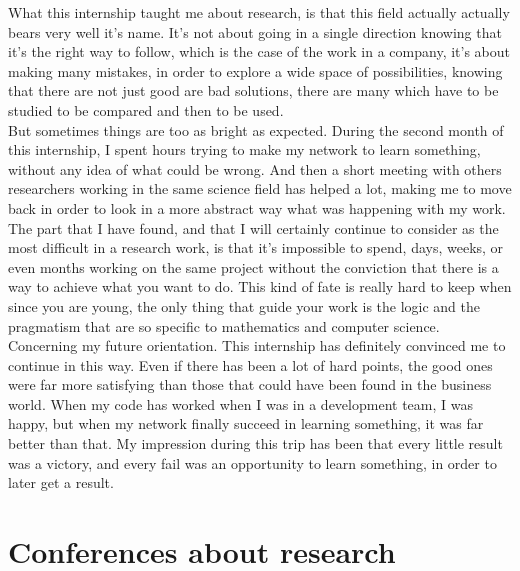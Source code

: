 \documentclass{report}
\begin{document}
		What this internship taught me about research, is that this field actually actually bears very well it's name. It's not about going in a single direction knowing that it's the right way to follow, which is the case of the work in a company, it's about making many mistakes, in order to explore a wide space of possibilities, knowing that there are not just good are bad solutions, there are many which have to be studied to be compared and then to be used.\\
		
		But sometimes things are too as bright as expected. During the second month of this internship, I spent hours trying to make my network to learn something, without any idea of what could be wrong. And then a short meeting with others researchers working in the same science field has helped a lot, making me to move back in order to look in a more abstract way what was happening with my work. The part that I have found, and that I will certainly continue to consider as the most difficult in a research work, is that it's impossible to spend, days, weeks, or even months working on the same project without the conviction that there is a way to achieve what you want to do. This kind of fate is really hard to keep when since you are young, the only thing that guide your work is the logic and the pragmatism that are so specific to mathematics and computer science.\\
		
		Concerning my future orientation. This internship has definitely convinced me to continue in this way. Even if there has been a lot of hard points, the good ones were far more satisfying than those that could have been found in the business world. When my code has worked when I was in a development team, I was happy, but when my network finally succeed in learning something, it was far better than that. My impression during this trip has been that every little result was a victory, and every fail was an opportunity to learn something, in order to later get a result.
		
		\section{Conferences about research}
		
\end{document}
